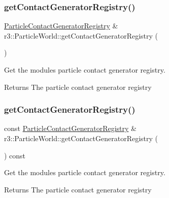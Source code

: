 \subsubsection{\texorpdfstring{get\+Contact\+Generator\+Registry()}{getContactGeneratorRegistry()}\hspace{0.1cm}{\footnotesize\ttfamily [1/2]}}
{\footnotesize\ttfamily \mbox{\hyperlink{classr3_1_1_particle_contact_generator_registry}{Particle\+Contact\+Generator\+Registry}} \& r3\+::\+Particle\+World\+::get\+Contact\+Generator\+Registry (\begin{DoxyParamCaption}{ }\end{DoxyParamCaption})}



Get the module\textquotesingle{}s particle contact generator registry. 

\begin{DoxyReturn}{Returns}
The particle contact generator registry 
\end{DoxyReturn}
\mbox{\label{classr3_1_1_particle_world_ab5cd3adaed73294927de72f3293b0709}} 
\subsubsection{\texorpdfstring{get\+Contact\+Generator\+Registry()}{getContactGeneratorRegistry()}\hspace{0.1cm}{\footnotesize\ttfamily [2/2]}}
{\footnotesize\ttfamily const \mbox{\hyperlink{classr3_1_1_particle_contact_generator_registry}{Particle\+Contact\+Generator\+Registry}} \& r3\+::\+Particle\+World\+::get\+Contact\+Generator\+Registry (\begin{DoxyParamCaption}{ }\end{DoxyParamCaption}) const}



Get the module\textquotesingle{}s particle contact generator registry. 

\begin{DoxyReturn}{Returns}
The particle contact generator registry 
\end{DoxyReturn}
\mbox{\label{classr3_1_1_particle_world_aaa3f952fdfd8862673d41afa078245bf}} 
